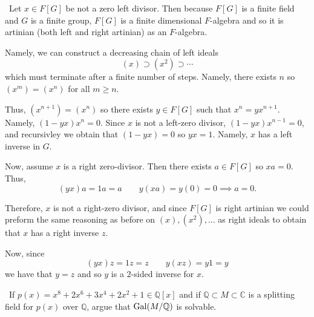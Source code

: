 \documentclass[12pt]{AlgebraQual}
\begin{document}
\begin{solution}$\,$
Let $x\in F[G]$ be not a zero left divisor. Then because $F[G]$ is a finite field and $G$ is a finite group, $F[G]$ is a finite dimensional $F$-algebra and so it is artinian (both left and right artinian) as an $F$-algebra.

Namely, we can construct a decreasing chain of left ideals $$(x)\supset (x^2)\supset\cdots$$ which must terminate after a finite number of steps. Namely, there exists $n$ so $(x^m)=(x^n)$ for all $m\ge n$.

Thus, $(x^{n+1})=(x^n)$ so there exists $y\in F[G]$ such that $x^n=yx^{n+1}$. Namely, $(1-yx)x^n=0$. Since $x$ is not a left-zero divisor, $(1-yx)x^{n-1}=0$, and recursivley we obtain that $(1-yx)=0$ so $yx=1$. Namely, $x$ has a left inverse in $G$.

Now, assume $x$ is a right zero-divisor. Then there exists $a\in F[G]$ so $xa=0$. Thus, $$(yx)a=1a=a\qquad y(xa)=y(0)=0\implies a=0.$$

Therefore, $x$ is not a right-zero divisor, and since $F[G]$ is right artinian we could preform the same reasoning as before on $(x),(x^2),...$ as right ideals to obtain that $x$ has a right inverse $z$.

Now, since $$(yx)z=1z=z\qquad y(xz)=y1=y$$ we have that $y=z$ and so $y$ is a $2$-sided inverse for $x.$
\end{solution}
\newpage



\begin{problem} $\,$
If $p(x)=x^8+2x^6+3x^4+2x^2+1\in\mathbb{Q}[x]$ and if $\mathbb{Q}\subset M\subset\mathbb{C}$ is a splitting field for $p(x)$ over $\mathbb{Q}$, argue that $\text{Gal}(M/\mathbb{Q})$ is solvable.
\end{problem}
\end{document}

